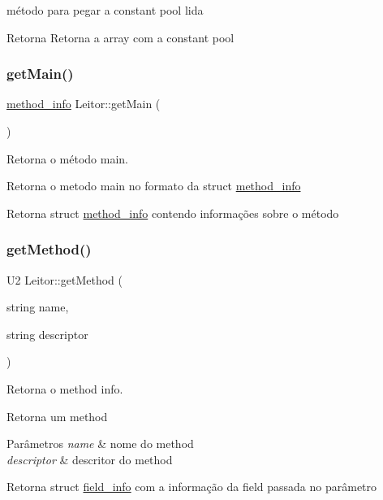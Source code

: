 método para pegar a constant pool lida \begin{DoxyReturn}{Retorna}
Retorna a array com a constant pool 
\end{DoxyReturn}
\mbox{\label{classLeitor_a462716ecacea891a2e07e77eec0dabe7}} 
\subsubsection{\texorpdfstring{get\+Main()}{getMain()}}
{\footnotesize\ttfamily \hyperlink{structmethod__info}{method\+\_\+info} Leitor\+::get\+Main (\begin{DoxyParamCaption}{ }\end{DoxyParamCaption})}



Retorna o método main. 

Retorna o metodo main no formato da struct \hyperlink{structmethod__info}{method\+\_\+info} \begin{DoxyReturn}{Retorna}
struct \hyperlink{structmethod__info}{method\+\_\+info} contendo informações sobre o método 
\end{DoxyReturn}
\mbox{\label{classLeitor_a721a60b281566287c7845c52a667ecc1}} 
\subsubsection{\texorpdfstring{get\+Method()}{getMethod()}}
{\footnotesize\ttfamily U2 Leitor\+::get\+Method (\begin{DoxyParamCaption}\item[{string}]{name,  }\item[{string}]{descriptor }\end{DoxyParamCaption})}



Retorna o method info. 

Retorna um method 
\begin{DoxyParams}{Parâmetros}
{\em name} & nome do method \\
\hline
{\em descriptor} & descritor do method \\
\hline
\end{DoxyParams}
\begin{DoxyReturn}{Retorna}
struct \hyperlink{structfield__info}{field\+\_\+info} com a informação da field passada no parâmetro
\end{DoxyReturn}

